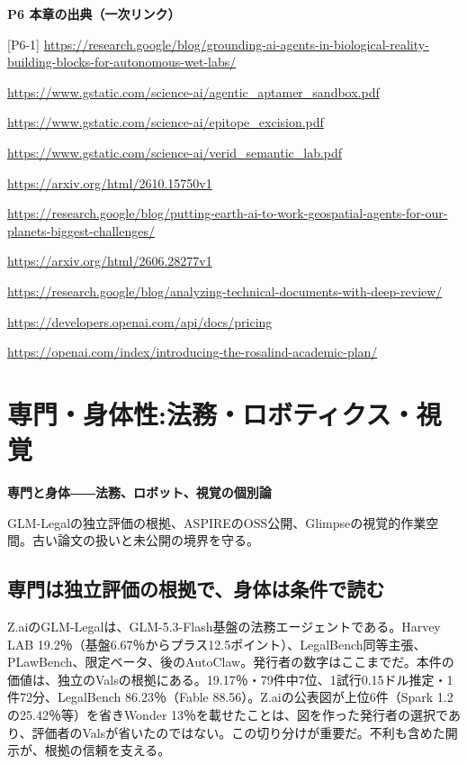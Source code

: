 \documentclass[lualatex,a4paper,10pt]{jlreq}
\begin{document}
\begin{tcolorbox}[colback=white,colframe=SurveyRule,arc=1mm,boxrule=0.4pt,left=2mm,right=2mm]
\textbf{P6 本章の出典（一次リンク）}\par\footnotesize
[P6-1] \url{https://research.google/blog/grounding-ai-agents-in-biological-reality-building-blocks-for-autonomous-wet-labs/}\par
[P6-2] \url{https://www.gstatic.com/science-ai/agentic_aptamer_sandbox.pdf}\par
[P6-3] \url{https://www.gstatic.com/science-ai/epitope_excision.pdf}\par
[P6-4] \url{https://www.gstatic.com/science-ai/verid_semantic_lab.pdf}\par
[P6-5] \url{https://arxiv.org/html/2610.15750v1}\par
[P6-6] \url{https://research.google/blog/putting-earth-ai-to-work-geospatial-agents-for-our-planets-biggest-challenges/}\par
[P6-7] \url{https://arxiv.org/html/2606.28277v1}\par
[P6-8] \url{https://research.google/blog/analyzing-technical-documents-with-deep-review/}\par
[P6-9] \url{https://developers.openai.com/api/docs/pricing}\par
[P6-10] \url{https://openai.com/index/introducing-the-rosalind-academic-plan/}\par
\end{tcolorbox}

\section{専門・身体性:法務・ロボティクス・視覚}
\label{sec:P7}

{\Large\bfseries 専門と身体――法務、ロボット、視覚の個別論\par}
\smallskip
{\color{SurveyMuted}GLM-Legalの独立評価の根拠、ASPIREのOSS公開、Glimpseの視覚的作業空間。古い論文の扱いと未公開の境界を守る。\par}
\bigskip

\subsection*{専門は独立評価の根拠で、身体は条件で読む}
Z.aiのGLM-Legalは、GLM-5.3-Flash基盤の法務エージェントである。Harvey LAB 19.2％（基盤6.67％からプラス12.5ポイント）、LegalBench同等主張、PLawBench、限定ベータ、後のAutoClaw。発行者の数字はここまでだ。本件の価値は、独立のValsの根拠にある。19.17％・79件中7位、1試行0.15ドル推定・1件72分、LegalBench 86.23％（Fable 88.56）。Z.aiの公表図が上位6件（Spark 1.2の25.42％等）を省きWonder 13％を載せたことは、図を作った発行者の選択であり、評価者のValsが省いたのではない。この切り分けが重要だ。不利も含めた開示が、根拠の信頼を支える。
\end{document}
